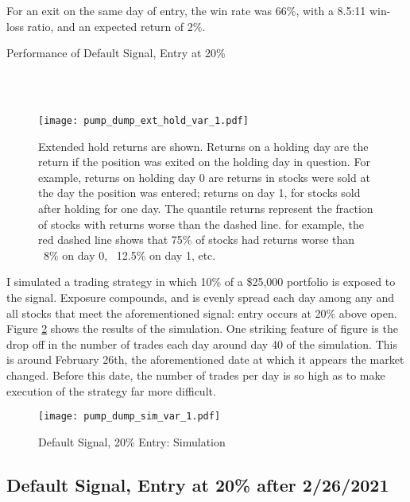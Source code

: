 \documentclass{article}
\begin{document}
For an exit on the same day of entry, the win rate was 66\%, with a 8.5:11 win-loss ratio, and an expected return of 2\%. 

\begin{table}
\caption{Performance of Default Signal, Entry at 20\%}
\\[2ex]


\\[2ex]

\label{tab_var_1}
\end{table}

\begin{figure}
\texttt{[image: pump\_dump\_ext\_hold\_var\_1.pdf]}
\caption{Extended hold returns are shown. Returns on a holding day are the return if the position was exited on the holding day in question. For example, returns on holding day 0 are returns in stocks were sold at the day the position was entered; returns on day 1, for stocks sold after holding for one day. The quantile returns represent the fraction of stocks with returns worse than the dashed line. for example, the red dashed line shows that 75\% of stocks had returns worse than ~8\% on day 0, ~12.5\% on day 1, etc.}
\label{fig_var_1_ext_hold}
\end{figure}

I simulated a trading strategy in which 10\% of a \$25,000 portfolio is exposed to the signal. Exposure compounds, and is evenly spread each day among any and all stocks that meet the aforementioned signal: entry occurs at 20\% above open. Figure \ref{fig_var_1_sim} shows the results of the simulation. One striking feature of figure \label{fig_var_1_sim} is the drop off in the number of trades each day around day 40 of the simulation. This is around February 26th, the aforementioned date at which it appears the market changed. Before this date, the number of trades per day is so high as to make execution of the strategy far more difficult.

\begin{figure}
\caption{Default Signal, 20\% Entry: Simulation}
\center
\texttt{[image: pump\_dump\_sim\_var\_1.pdf]}
\label{fig_var_1_sim}
\end{figure}

\pagebreak

\subsection{Default Signal, Entry at 20\% after 2/26/2021}
\end{document}
